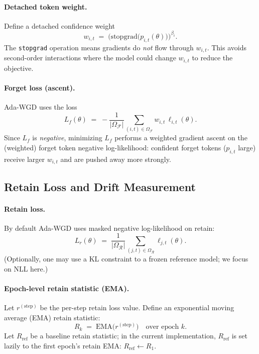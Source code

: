   \paragraph{Detached token weight.}
  Define a detached confidence weight
  \[
  w_{i,t} \;=\; \Big(\mathrm{stopgrad}\big(p_{i,t}(\theta)\big)\Big)^{\beta_i}.
  \]
  The \texttt{stopgrad} operation means gradients do \emph{not} flow through $w_{i,t}$.
  This avoids second-order interactions where the model could change $w_{i,t}$ to reduce the objective.

  \paragraph{Forget loss (ascent).}
  Ada-WGD uses the loss
  \[
  L_f(\theta)
  \;=\;
  -\frac{1}{|\Omega_{\mathcal{F}}|}
  \sum_{(i,t)\in\Omega_{\mathcal{F}}}
  w_{i,t}\,\ell_{i,t}(\theta).
  \]
  Since $L_f$ is \emph{negative}, minimizing $L_f$ performs a weighted gradient ascent on the (weighted)
  forget token negative log-likelihood: confident forget tokens ($p_{i,t}$ large) receive larger $w_{i,t}$
  and are pushed away more strongly.

  \subsection{Retain Loss and Drift Measurement}

  \paragraph{Retain loss.}
  By default Ada-WGD uses masked negative log-likelihood on retain:
  \[
  L_r(\theta)
  \;=\;
  \frac{1}{|\Omega_{\mathcal{R}}|}
  \sum_{(j,t)\in\Omega_{\mathcal{R}}}
  \ell_{j,t}(\theta).
  \]
  (Optionally, one may use a KL constraint to a frozen reference model; we focus on NLL here.)

  \paragraph{Epoch-level retain statistic (EMA).}
  Let $r^{(\mathrm{step})}$ be the per-step retain loss value.
  Define an exponential moving average (EMA) retain statistic:
  \[
  R_k \;=\; \mathrm{EMA}\big(r^{(\mathrm{step})}\big)\quad \text{over epoch }k.
  \]
  Let $R_{\mathrm{ref}}$ be a baseline retain statistic; in the current implementation,
  $R_{\mathrm{ref}}$ is set lazily to the first epoch's retain EMA: $R_{\mathrm{ref}}\leftarrow R_1$.

